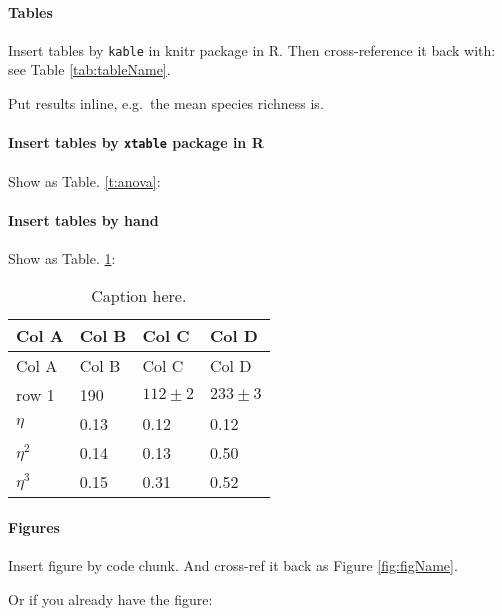 \documentclass[
  12pt,
]{article}
\begin{document}
\hypertarget{tables}{%
\paragraph{Tables}\label{tables}}

Insert tables by \texttt{kable} in knitr package in R. Then cross-reference it back with: see Table \ref{tab:tableName}.



Put results inline, e.g.~the mean species richness is.

\hypertarget{insert-tables-by-xtable-package-in-r}{%
\paragraph{\texorpdfstring{Insert tables by \texttt{xtable} package in R}{Insert tables by xtable package in R}}\label{insert-tables-by-xtable-package-in-r}}

Show as Table. \ref{t:anova}:

\hypertarget{insert-tables-by-hand}{%
\paragraph{Insert tables by hand}\label{insert-tables-by-hand}}

Show as Table. \ref{tab:byhand}:

\begin{longtable}[]{@{}llll@{}}
\caption{\label{tab:byhand} Caption here.}\tabularnewline
\toprule
Col A & Col B & Col C & Col D \\
\midrule
\endfirsthead
\toprule
Col A & Col B & Col C & Col D \\
\midrule
\endhead
row 1 & 190 & \(112 \pm 2\) & \(233 \pm 3\) \\
\(\eta\) & 0.13 & 0.12 & 0.12 \\
\(\eta^2\) & 0.14 & 0.13 & 0.50 \\
\(\eta^3\) & 0.15 & 0.31 & 0.52 \\
\bottomrule
\end{longtable}

\hypertarget{figures}{%
\paragraph{Figures}\label{figures}}

Insert figure by code chunk. And cross-ref it back as Figure \ref{fig:figName}.



Or if you already have the figure:
\end{document}
